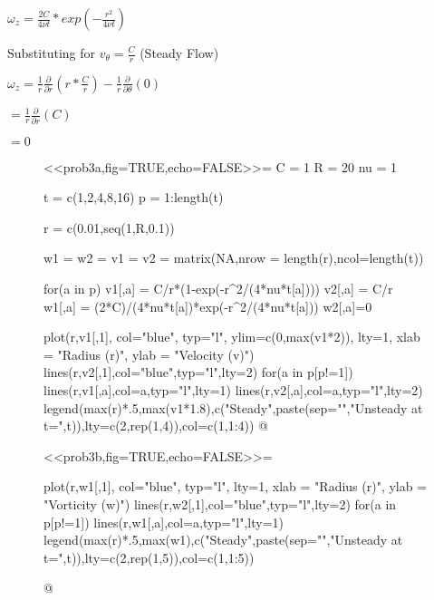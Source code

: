 \documentclass{article}
\begin{document}
$\omega_{z} = \frac{2C}{4\nu t}*exp(-\frac{r^{2}}{4\nu t})$

Substituting for $v_{\theta } = \frac{C}{r}$ (Steady Flow)

$\omega_{z} = \frac{1}{r}\frac{\partial}{\partial r}(r*\frac{C}{r}) - \frac{1}{r}\frac{\partial}{\partial \theta}(0)$

$ = \frac{1}{r}\frac{\partial}{\partial r}(C)$

$ = 0$

\begin{figure}[H]
\begin{center}
\begin{minipage}[t]{.48\linewidth}
<<prob3a,fig=TRUE,echo=FALSE>>=
C = 1
R = 20
nu = 1

t = c(1,2,4,8,16)
p = 1:length(t)

r = c(0.01,seq(1,R,0.1))

w1 = w2 = v1 = v2 = matrix(NA,nrow = length(r),ncol=length(t))

for(a in p){
v1[,a] = C/r*(1-exp(-r^2/(4*nu*t[a])))
v2[,a] = C/r
w1[,a] = (2*C)/(4*nu*t[a])*exp(-r^2/(4*nu*t[a]))
w2[,a]=0
}

plot(r,v1[,1],
		col="blue",
		typ="l",
		ylim=c(0,max(v1*2)),
		lty=1,
		xlab = "Radius (r)",
		ylab = "Velocity (v)")
lines(r,v2[,1],col="blue",typ="l",lty=2)
for(a in p[p!=1]){
lines(r,v1[,a],col=a,typ="l",lty=1)
lines(r,v2[,a],col=a,typ="l",lty=2)
}
legend(max(r)*.5,max(v1*1.8),c("Steady",paste(sep="","Unsteady at t=",t)),lty=c(2,rep(1,4)),col=c(1,1:4))
@
\end{minipage}
\begin{minipage}[t]{.48\linewidth}
<<prob3b,fig=TRUE,echo=FALSE>>=

plot(r,w1[,1],
		col="blue",
		typ="l",
		lty=1,
		xlab = "Radius (r)",
		ylab = "Vorticity (w)")
lines(r,w2[,1],col="blue",typ="l",lty=2)
for(a in p[p!=1]){
	lines(r,w1[,a],col=a,typ="l",lty=1)
}
legend(max(r)*.5,max(w1),c("Steady",paste(sep="","Unsteady at t=",t)),lty=c(2,rep(1,5)),col=c(1,1:5))


@
\end{minipage}
\end{center}
\end{figure}
\end{document}
